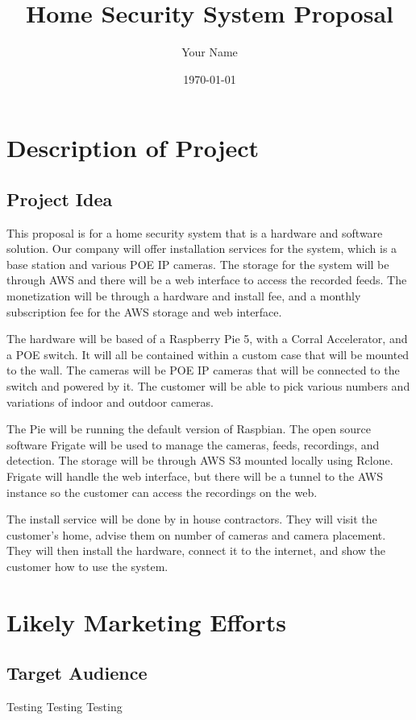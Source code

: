 \documentclass{report}
\title{Home Security System Proposal}
\author{Your Name}
\date{\today}
\begin{document}
\maketitle

\tableofcontents
\newpage

\chapter{Description of Project}
\section{Project Idea}
This proposal is for a home security system that is a hardware and software solution.
Our company will offer installation services for the system, which is a base station and various POE IP cameras.
The storage for the system will be through AWS and there will be a web interface to access the recorded feeds.
The monetization will be through a hardware and install fee, and a monthly subscription fee for the AWS storage and web interface.

The hardware will be based of a Raspberry Pie 5, with a Corral Accelerator, and a POE switch.
It will all be contained within a custom case that will be mounted to the wall.
The cameras will be POE IP cameras that will be connected to the switch and powered by it.
The customer will be able to pick various numbers and variations of indoor and outdoor cameras.

The Pie will be running the default version of Raspbian.
The open source software Frigate will be used to manage the cameras, feeds, recordings, and detection.
The storage will be through AWS S3 mounted locally using Rclone.
Frigate will handle the web interface, but there will be a tunnel to the AWS instance so the customer can access the recordings on the web.

The install service will be done by in house contractors.
They will visit the customer's home, advise them on number of cameras and camera placement.
They will then install the hardware, connect it to the internet, and show the customer how to use the system.


\chapter{Likely Marketing Efforts}
\section{Target Audience}
Testing Testing Testing
\end{document}
